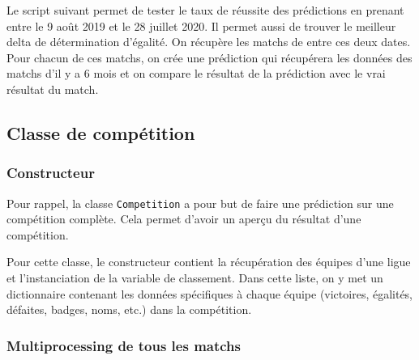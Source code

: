 \documentclass[a4paper,14pt]{extarticle}
\begin{document}
{Le script suivant permet de tester le taux de réussite des prédictions en prenant entre le 9 août 2019 et le 28 juillet 2020. Il permet aussi de trouver le meilleur delta de détermination d'égalité. On récupère les matchs de entre ces deux dates. Pour chacun de ces matchs, on crée une prédiction qui récupérera les données des matchs d'il y a 6 mois et on compare le résultat de la prédiction avec le vrai résultat du match.


\subsection{Classe de compétition}

\subsubsection{Constructeur}

Pour rappel, la classe \texttt{Competition} a pour but de faire une prédiction sur une compétition complète. Cela permet d'avoir un aperçu du résultat d'une compétition.

Pour cette classe, le constructeur contient la récupération des équipes d'une ligue et l'instanciation de la variable de classement. Dans cette liste, on y met un dictionnaire contenant les données spécifiques à chaque équipe (victoires, égalités, défaites, badges, noms, etc.) dans la compétition.


\subsubsection{Multiprocessing de tous les matchs}

}
\end{document}
